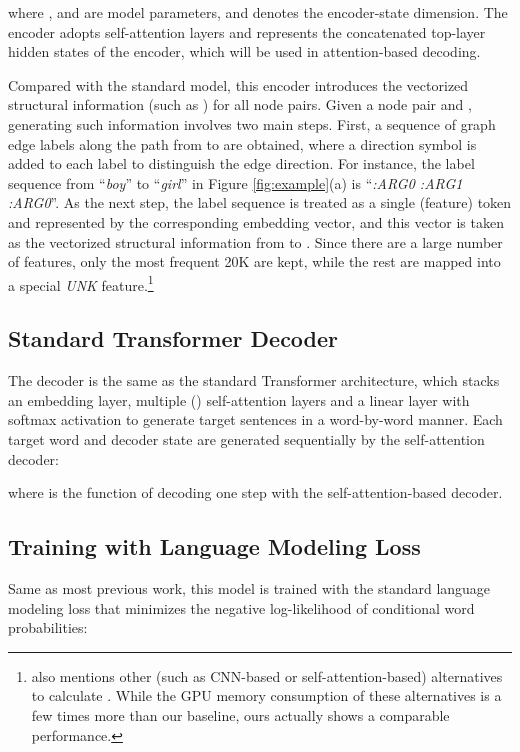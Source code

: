 \documentclass[11pt,a4paper]{article}
\begin{document}
where ,  and  are model parameters, and  denotes the encoder-state dimension.
The encoder adopts  self-attention layers and   represents the concatenated top-layer hidden states of the encoder, which will be used in attention-based decoding.


Compared with the standard model, this encoder introduces the vectorized structural information (such as ) for all node pairs.
Given a node pair  and , generating such information involves two main steps.
First, a sequence of graph edge labels along the path from  to  are obtained, where a direction symbol is added to each label to distinguish the edge direction.
For instance, the label sequence from ``\emph{boy}'' to ``\emph{girl}'' in Figure \ref{fig:example}(a) is ``\emph{:ARG0 :ARG1 :ARG0}''.
As the next step, the label sequence is treated as a single (feature) token and represented by the corresponding embedding vector, and this vector is taken as the vectorized structural information  from  to .
Since there are a large number of features, only the most frequent 20K are kept, while the rest are mapped into a special \emph{UNK} feature.\footnote{\citet{zhu2019modeling} also mentions other (such as CNN-based or self-attention-based) alternatives to calculate . While the GPU memory consumption of these alternatives is a few times more than our baseline, ours actually shows a comparable performance.}


\subsection{Standard Transformer Decoder}


The decoder is the same as the standard Transformer architecture, which stacks an embedding layer, multiple () self-attention layers and a linear layer with softmax activation to generate target sentences in a word-by-word manner.
Each target word  and decoder state  are generated sequentially by the self-attention decoder:

where  is the function of decoding one step with the self-attention-based decoder.


\subsection{Training with Language Modeling Loss}


Same as most previous work, this model is trained with the standard language modeling loss that minimizes the negative log-likelihood of conditional word probabilities:
\end{document}
